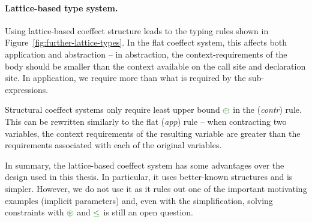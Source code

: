 
\paragraph{Lattice-based type system.}
\hspace{-1em}
Using lattice-based coeffect structure leads to the typing rules shown in Figure~\ref{fig:further-lattice-types}.
In the flat coeffect system, this affects both application and abstraction -- in abstraction,
the context-requirements of the body should be smaller than the context available on the
call site and declaration site. In application, we require more than what is required by
the sub-expressions.

Structural coeffect systems only require least upper bound $\cpar$ in the (\emph{contr}) rule.
This can be rewritten similarly to the flat (\emph{app}) rule --  when contracting two variables, the
context requirements of the resulting variable are greater than the requirements associated with
each of the original variables.

In summary, the lattice-based coeffect system has some advantages over the design used in this
thesis. In particular, it uses better-known structures and is simpler. However, we do not use
it as it rules out one of the important motivating examples (implicit parameters) and, even with
the simplification, solving constraints with $\cseq$ and $\cleq$ is still an open question.



%

